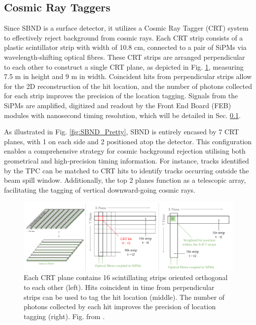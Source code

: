 \subsection{Cosmic Ray Taggers}

Since SBND is a surface detector, it utilizes a Cosmic Ray Tagger (CRT) system to effectively reject background from cosmic rays. 
Each CRT strip consists of a plastic scintillator strip  with width of 10.8 cm, connected to a pair of SiPMs via wavelength-shifting optical fibres.
These CRT strips are arranged perpendicular to each other to construct a single CRT plane, as depicted in Fig. \ref{fig:SBND_CRT}, measuring 7.5 m in height and 9 m in width. 
Coincident hits from perpendicular strips allow for the 2D reconstruction of the hit location, and the number of photons collected for each strip improves the precision of the location tagging.
Signals from the SiPMs are amplified, digitized and readout by the Front End Board (FEB) modules with nanosecond timing resolution, which will be detailed in Sec. \ref{}.

As illustrated in Fig. \ref{fig:SBND_Pretty}, SBND is entirely encased by 7 CRT planes, with 1 on each side and 2 positioned atop the detector. 
This configuration enables a comprehensive strategy for cosmic background rejection utilising both geometrical and high-precision timing information.
For instance, tracks identified by the TPC can be matched to CRT hits to identify tracks occurring outside the beam spill window.
Additionally, the top 2 planes function as a telescopic array, facilitating the tagging of vertical downward-going cosmic rays.

\begin{figure}[htbp] 
\centering    
\includegraphics[width=1.0\textwidth]{SBND_CRT}
\caption[SBND_CRT]{
Each CRT plane contains 16 scintillating strips oriented orthogonal to each other (left).
Hits coincident in time from perpendicular strips can be used to tag the hit location (middle).
The number of photons collected by each hit improves the precision of location tagging (right).
Fig. from \cite{RhiannonPhD}.
}
\label{fig:SBND_CRT}
\end{figure}

